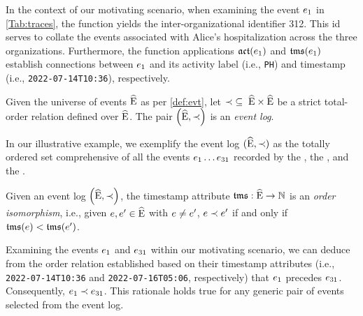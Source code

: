 \begin{newj}
%
In the context of our motivating scenario, when examining the event $e_1$ in \cref{Tab:traces}, the {\CIdF} function yields the inter-organizational identifier 312. This id serves to collate the events associated with Alice's hospitalization across the three organizations. Furthermore, the function applications {$\mathfrak{act}(e_1)$} and {$\mathfrak{tms}(e_1)$} establish connections between $e_1$ and its activity label (i.e., \texttt{PH}) and timestamp (i.e., \texttt{2022-07-14T10:36}), respectively.
%
\begin{definition}\label{def:evt:log}
	Given the universe of events $\widehat{\mathrm{E}}$ as per \cref{def:evt}, let ${\prec \;\subseteq\; \widehat{\mathrm{E}} \times \widehat{\mathrm{E}}}$ be a strict total-order relation defined over $\widehat{\mathrm{E}}$.
	The pair $\left( \widehat{\mathrm{E}}, \prec \right)$ is an \emph{event log}.
\end{definition}
In our illustrative example, we exemplify the event log $(\widehat{\mathrm{E}},\prec)$ as the totally ordered set comprehensive of all the events $e_1 \dots e_{31}$ recorded by the , the , and the .
%
\begin{assumption}\label{asm:order:timestamp}
	Given an event log $\left( \widehat{\mathrm{E}}, \prec \right)$, the timestamp attribute $\mathfrak{tms}: \widehat{\mathrm{E}} \to \mathbb{N}$ is an \textit{order isomorphism}, i.e., given $e, e' \in \widehat{\mathrm{E}}$ with $e \neq e'$, $e \prec e'$ if and only if $\mathfrak{tms}(e) < \mathfrak{tms}(e')$.
\end{assumption}
%
Examining the events $e_{1}$ and $e_{31}$ within our motivating scenario, we can deduce from the order relation established based on their timestamp attributes (i.e., \texttt{2022-07-14T10:36} and \texttt{2022-07-16T05:06}, respectively) that $e_{1}$ precedes $e_{31}$. Consequently, ${e_1}\prec{\ensuremath{e}_{31}}$. This rationale holds true for any generic pair of events selected from the event log.
%


\end{newj}

